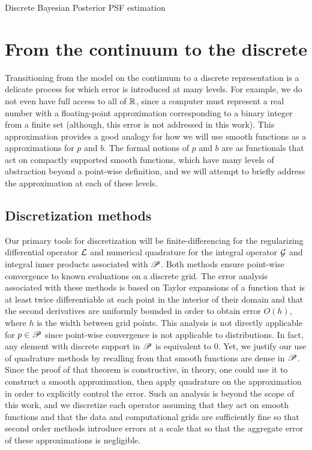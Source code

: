 \begin{chapter}{Discrete Bayesian Posterior PSF estimation}
\section{From the continuum to the discrete} \label{sec:discretization}

Transitioning from the model on the continuum to a discrete representation is a delicate process for which error is introduced at many levels.  
For example, we do not even have full access to all of $\mathbb R$, since a computer must represent a real number with a floating-point approximation corresponding to a binary integer from a finite set (although, this error is not addressed in this work). 
This approximation provides a good analogy for how we will use smooth functions as a approximations for $p$ and $b$.
The formal notions of $p$ and $b$ are as functionals that act on compactly supported smooth functions, which have many levels of abstraction beyond a point-wise definition, and we will attempt to briefly address the approximation at each of these levels.

\subsection{Discretization methods}
Our primary tools for discretization will be finite-differencing for the regularizing differential operator $\mathcal L$ and numerical quadrature for the integral operator $\mathcal G$ and integral inner products associated with $\mathscr P$.
Both methods ensure point-wise convergence to known evaluations on a discrete grid.
The error analysis associated with these methods is based on Taylor expansions of a function that is at least twice differentiable at each point in the interior of their domain and that the second derivatives are uniformly bounded in order to obtain error $O(h)$, where $h$ is the width between grid points.
This analysis is not directly applicable for $p \in \mathscr P$ since point-wise convergence is not applicable to distributions.
In fact, any element with discrete support in $\mathscr P$ is equivalent to $0$.
Yet, we justify our use of quadrature methods by recalling from  that smooth functions are dense in $\mathscr P$.
  Since the proof of that theorem is constructive, in theory, one could use it to construct a smooth approximation, then apply quadrature on the approximation in order to explicitly control the error.
Such an analysis is beyond the scope of this work, and we discretize each operator assuming that they act on smooth functions and that the data and computational grids are sufficiently fine so that second order methods introduce errors at a scale that so that the aggregate error of these approximations is negligible.


\end{chapter}
